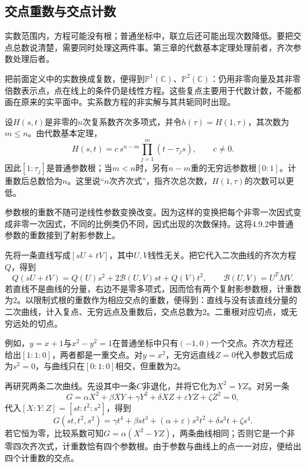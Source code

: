 \subsection{交点重数与交点计数}
\label{subsec:quadratic-intersection-counting}

实数范围内，方程可能没有根；普通坐标中，联立后还可能出现次数降低。要把交点总数说清楚，需要同时处理这两件事。第三章的代数基本定理处理前者，齐次参数处理后者。

把前面定义中的实数换成复数，便得到\(\mathbb P^1(\mathbb C)\)、\(\mathbb P^2(\mathbb C)\)：仍用非零向量及其非零倍数表示点，点在线上的条件仍是线性方程。这些复点主要用于代数计数，不能都画在原来的实平面中。实系数方程的非实解与其共轭同时出现。

设\(H(s,t)\)是非零的\(n\)次复系数齐次多项式，并令\(h(\tau)=H(1,\tau)\)，其次数为\(m\le n\)。由代数基本定理，
\begin{equation}\label{eq:quadratic-binary-form-factorization}
 H(s,t)=c\,s^{n-m}\prod_{j=1}^{m}(t-\tau_js),\qquad c\ne0.
\end{equation}
因此\([1:\tau_j]\)是普通参数根；当\(m<n\)时，另有\(n-m\)重的无穷远参数根\([0:1]\)。计重数后总数恰为\(n\)。这里说“\(n\)次齐次式”，指齐次总次数，\(H(1,\tau)\)的次数可以更低。

参数根的重数不随可逆线性参数变换改变。因为这样的变换把每个非零一次因式变成非零一次因式，不同的比例类仍不同，因式出现的次数保持。这将4.9.2中普通参数的重数接到了射影参数上。

先将一条直线写成\([sU+tV]\)，其中\(U,V\)线性无关。把它代入二次曲线的齐次方程\(Q\)，得到
\begin{equation}\label{eq:quadratic-projective-line-restriction}
 Q(sU+tV)=Q(U)s^2+2\mathcal B(U,V)st+Q(V)t^2,
 \qquad \mathcal B(U,V)=U^TMV.
\end{equation}
若直线不是曲线的分量，右边不是零多项式，因而恰有两个复射影参数根，计重数为\(2\)。以限制式根的重数作为相应交点的重数，便得到：{\heiti{}直线与没有该直线分量的二次曲线，计入复点、无穷远点及重数后，交点总数为\(2\)。}二重根对应切点，或无穷远处的切点。

例如，\(y=x+1\)与\(x^2-y^2=1\)在普通坐标中只有\((-1,0)\)一个交点。齐次方程还给出\([1:1:0]\)，两者都是一重交点。对\(y=x^2\)，无穷远直线\(Z=0\)代入参数式后成为\(s^2=0\)，与曲线只在\([0:1:0]\)相交，但重数为\(2\)。

再研究两条二次曲线。先设其中一条\(C\)非退化，并将它化为\(X^2=YZ\)。对另一条
\begin{equation*}
 G=\alpha X^2+\beta XY+\gamma Y^2+\delta XZ+\varepsilon YZ+\zeta Z^2=0,
\end{equation*}
代入\([X:Y:Z]=[st:t^2:s^2]\)，得到
\begin{equation}\label{eq:quadratic-conic-quartic-restriction}
 G(st,t^2,s^2)=\gamma t^4+\beta st^3
 +(\alpha+\varepsilon)s^2t^2+\delta s^3t+\zeta s^4.
\end{equation}
若它恒为零，比较系数可知\(G=\alpha(X^2-YZ)\)，两条曲线相同；否则它是一个非零四次齐次式，计重数恰有四个参数根。由于参数与曲线上的点一一对应，便给出四个计重数的交点。

